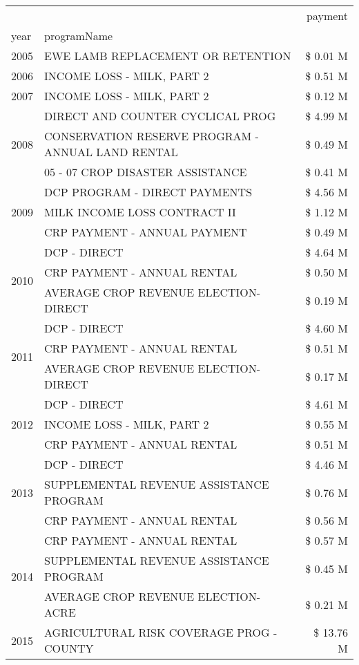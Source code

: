 \begin{tabular}{llr}
\toprule
 &  & payment \\
year & programName &  \\
\midrule
2005 & EWE LAMB REPLACEMENT OR RETENTION & \$ 0.01 M \\
\cline{1-3}
2006 & INCOME LOSS - MILK, PART 2 & \$ 0.51 M \\
\cline{1-3}
2007 & INCOME LOSS - MILK, PART 2 & \$ 0.12 M \\
\cline{1-3}
\multirow[t]{3}{*}{2008} & DIRECT AND COUNTER CYCLICAL PROG & \$ 4.99 M \\
 & CONSERVATION RESERVE PROGRAM - ANNUAL LAND RENTAL & \$ 0.49 M \\
 & 05 - 07 CROP DISASTER ASSISTANCE & \$ 0.41 M \\
\cline{1-3}
\multirow[t]{3}{*}{2009} & DCP PROGRAM - DIRECT PAYMENTS & \$ 4.56 M \\
 & MILK INCOME LOSS CONTRACT II & \$ 1.12 M \\
 & CRP PAYMENT - ANNUAL PAYMENT & \$ 0.49 M \\
\cline{1-3}
\multirow[t]{3}{*}{2010} & DCP - DIRECT & \$ 4.64 M \\
 & CRP PAYMENT - ANNUAL RENTAL & \$ 0.50 M \\
 & AVERAGE CROP REVENUE ELECTION-DIRECT & \$ 0.19 M \\
\cline{1-3}
\multirow[t]{3}{*}{2011} & DCP - DIRECT & \$ 4.60 M \\
 & CRP PAYMENT - ANNUAL RENTAL & \$ 0.51 M \\
 & AVERAGE CROP REVENUE ELECTION-DIRECT & \$ 0.17 M \\
\cline{1-3}
\multirow[t]{3}{*}{2012} & DCP - DIRECT & \$ 4.61 M \\
 & INCOME LOSS - MILK, PART 2 & \$ 0.55 M \\
 & CRP PAYMENT - ANNUAL RENTAL & \$ 0.51 M \\
\cline{1-3}
\multirow[t]{3}{*}{2013} & DCP - DIRECT & \$ 4.46 M \\
 & SUPPLEMENTAL REVENUE ASSISTANCE PROGRAM & \$ 0.76 M \\
 & CRP PAYMENT - ANNUAL RENTAL & \$ 0.56 M \\
\cline{1-3}
\multirow[t]{3}{*}{2014} & CRP PAYMENT - ANNUAL RENTAL & \$ 0.57 M \\
 & SUPPLEMENTAL REVENUE ASSISTANCE PROGRAM & \$ 0.45 M \\
 & AVERAGE CROP REVENUE ELECTION-ACRE & \$ 0.21 M \\
\cline{1-3}
\multirow[t]{3}{*}{2015} & AGRICULTURAL RISK COVERAGE PROG - COUNTY & \$ 13.76 M \\

\end{tabular}
